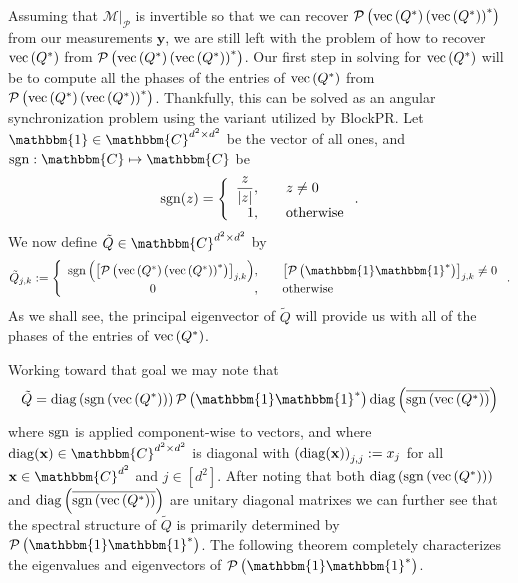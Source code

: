 \documentclass[]{spie}  %
\def \x {\mathbf x}
\def \y {\mathbf y}
\def \one { \mathbbm{1}}
\def \sgn {{\rm sgn}}
\def \diag {{\rm diag}}
\begin{document}
Assuming that $\mathcal{M} \big|_{\mathcal{P}}$ is invertible so that we can recover $\mathcal{P} \left( {\rm vec}\left(Q^* \right) \left( {\rm vec} \left(Q^* \right) \right)^* \right)$ from our measurements $\y$, we are still left with the problem of how to recover ${\rm vec}\left(Q^* \right)$ from $\mathcal{P} \left( {\rm vec}\left(Q^* \right) \left( {\rm vec} \left(Q^* \right) \right)^* \right)$.  Our first step in solving for ${\rm vec}\left(Q^* \right)$ will be to compute all the phases of the entries of ${\rm vec}\left(Q^* \right)$ from $\mathcal{P} \left( {\rm vec}\left(Q^* \right) \left( {\rm vec} \left(Q^* \right) \right)^* \right)$.  Thankfully, this can be solved as an angular synchronization problem\cite{singer2011angular} using the variant utilized by BlockPR.\cite{viswanathana2015fast,iwen2016phase}  Let $\one \in \mathbbm{C}^{d^2 \times d^2}$ be the vector of all ones, and $\sgn: \mathbbm{C} \mapsto  \mathbbm{C}$ be 
$$\sgn(z) = \left\{\begin{array}{r@{,\qquad}l} \dfrac{z}{|z|} & z \neq 0 \\ 1 & \text{otherwise} \end{array}\right..$$
We now define $\tilde{Q} \in \mathbbm{C}^{d^2 \times d^2}$ by
\begin{equation}
\tilde{Q}_{j,k} := \left\{\begin{array}{r@{,\qquad}l} \sgn \left( \left[ \mathcal{P} \left( {\rm vec}\left(Q^* \right) \left( {\rm vec} \left(Q^* \right) \right)^* \right) \right]_{j,k} \right) & \left[ \mathcal{P} \left( \one \one^* \right) \right]_{j,k} \neq 0 \\ 0~~~~~~~~~~~~~~~~~~~~~~~~ & \text{otherwise} \end{array}\right..
\label{def:Qtilde}
\end{equation}
As we shall see, the principal eigenvector of $\tilde{Q}$ will provide us with all of the phases of the entries of ${\rm vec}\left(Q^* \right)$.

Working toward that goal we may note that
\begin{equation}
\tilde{Q} = \diag \left( \sgn \left( {\rm vec} \left(Q^* \right) \right) \right) \mathcal{P} \left( \one \one^* \right) \diag \left( \overline{\sgn \left( {\rm vec} \left(Q^* \right) \right)} \right)
\label{equ:Qtilde_partial_factor}
\end{equation}
where $\sgn$ is applied component-wise to vectors, and where $\diag(\x)  \in \mathbbm{C}^{d^2 \times d^2}$ is diagonal with $\left(\diag(\x)\right)_{j,j} := x_j$ for all $\x \in \mathbbm{C}^{d^2}$ and $j \in [d^2]$.  After noting that both $\diag \left( \sgn \left( {\rm vec} \left(Q^* \right) \right) \right)$ and $\diag \left( \overline{\sgn \left( {\rm vec} \left(Q^* \right) \right)} \right)$ are unitary diagonal matrixes we can further see that the spectral structure of $\tilde{Q}$ is primarily  determined by $\mathcal{P} \left( \one \one^* \right)$.  The following theorem completely characterizes the eigenvalues and eigenvectors of $\mathcal{P} \left( \one \one^* \right)$.
\end{document}
